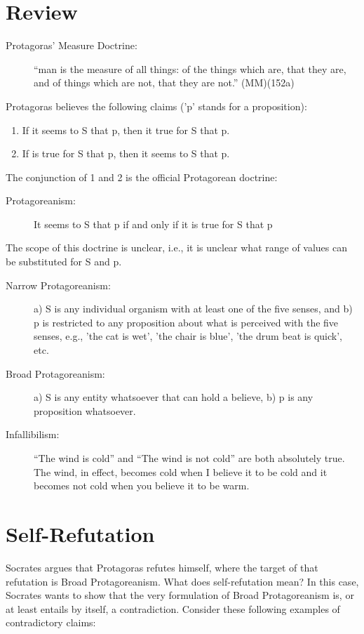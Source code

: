 \documentclass[oneside]{article}
\begin{document}
\section*{Review}
\begin{description}
\item[Protagoras' Measure Doctrine:] ``man is the measure of all things: of the things which are, that they are, and of things which are not, that they are not.'' (MM)(152a) 
\end{description}
Protagoras believes the following claims ('p' stands for a proposition): 
\begin{enumerate}
\item If it seems to S that p, then it true for S that p.
\item If is true for S that p, then it seems to S that p.
\end{enumerate}
The conjunction of 1 and 2 is the official Protagorean doctrine: 
\begin{description}
\item[Protagoreanism:] It seems to S that p  if and only if it is true for S that p 
\end{description}
The scope of this doctrine is unclear, i.e., it is unclear what range of values can be substituted for S and p.
\begin{description}
\item[Narrow Protagoreanism:] a)  S is any individual organism with at least one of the five senses, and b) p is restricted to any proposition about what is perceived with the five senses, e.g., 'the cat is wet', 'the chair is blue', 'the drum beat is quick', etc. 
\item[Broad Protagoreanism:] a) S is any entity whatsoever that can hold a believe, b) p is any proposition whatsoever.
\end{description} 

\begin{description}
\item[Infallibilism:] ``The wind is cold'' and ``The wind is not cold'' are both absolutely true. The wind, in effect, becomes cold when I believe it to be cold and it becomes not cold when you believe it to be warm. 
\end{description}


\section*{Self-Refutation}


Socrates argues that Protagoras refutes himself, where the target of that refutation is Broad Protagoreanism. What does self-refutation mean? In this case, Socrates wants to show that the very formulation of Broad Protagoreanism is, or at least entails by itself, a contradiction. Consider these following examples of contradictory claims: 
\end{document}
